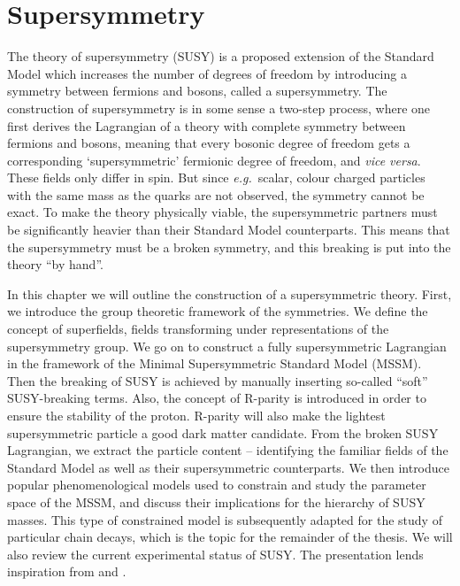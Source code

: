 \documentclass[twoside,english]{uiofysmaster}
\begin{document}
\chapter{Supersymmetry}%
\label{ch:susyintro}
The theory of supersymmetry (SUSY) is a proposed extension of the Standard Model which increases the number of degrees of freedom by introducing a symmetry between fermions and bosons, called a supersymmetry. The construction of supersymmetry is in some sense a two-step process, where one first derives the Lagrangian of a theory with complete symmetry between fermions and bosons, meaning that every bosonic degree of freedom gets a corresponding `supersymmetric' fermionic degree of freedom, and {\it vice versa}. These fields only differ in spin. But since {\it e.g.}\ scalar, colour charged particles with the same mass as the quarks are not observed, the symmetry cannot be exact. To make the theory physically viable, the supersymmetric partners must be significantly heavier than their Standard Model counterparts. This means that the supersymmetry must be a broken symmetry, and this breaking is put into the theory ``by hand''.

In this chapter we will outline the construction of a supersymmetric theory. First, we introduce the group theoretic framework of the symmetries. We define the concept of superfields, fields transforming under representations of the supersymmetry group. We go on to construct a fully supersymmetric Lagrangian in the framework of the Minimal Supersymmetric Standard Model (MSSM). Then the breaking of SUSY is achieved by manually inserting so-called ``soft'' SUSY-breaking terms. Also, the concept of R-parity is introduced in order to ensure the stability of the proton. R-parity will also make the lightest supersymmetric particle a good dark matter candidate. From the broken SUSY Lagrangian, we extract the particle content -- identifying the familiar fields of the Standard Model as well as their supersymmetric counterparts. We then introduce popular phenomenological models used to constrain and study the parameter space of the MSSM, and discuss their implications for the hierarchy of SUSY masses. This type of constrained model is subsequently adapted for the study of particular chain decays, which is the topic for the remainder of the thesis. We will also review the current experimental status of SUSY. The presentation lends inspiration from \cite{Batzing:2013} and \cite{Leinonen:2014}.
\end{document}
